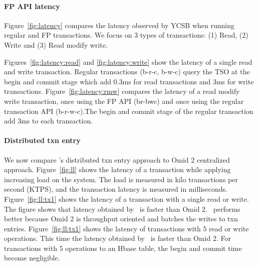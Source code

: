 \paragraph{FP API latency}
Figure~\ref{fig:latency} compares the latency observed by YCSB when running regular and FP transactions.
We focus on 3 types of transactions: (1) Read, (2) Write and (3) Read modify write.

Figures~\ref{fig:latency:read} and \ref{fig:latency:write} show the latency of a single read and write transaction. Regular transactions (b-r-c, b-w-c) query the TSO at the begin and commit stage which add 0.3ms for read transactions and 3ms for write transactions.
Figure~\ref{fig:latency:rmw} compares the latency of a read modify write transaction, once using the FP API (br-bwc) and once using the regular transaction API (b-r-w-c).The begin and commit stage of the regular transaction add 3ms to each transaction.

\paragraph{Distributed txn entry}
We now compare \sys's distributed txn entry approach to Omid 2 centralized approach. Figure~\ref{fig:ll} shows the latency of a transaction while applying increasing load on the system. The load is measured in kilo transactions per second (KTPS), and the transaction latency is measured in milliseconds. Figure~\ref{fig:ll:tx1} shows the latency of a transaction with a single read or write. The figure shows that latency obtained by \sys\ is  faster than Omid 2. \sys\ performs better because Omid 2 is throughput oriented and batches the writes to txn entries.
Figure~\ref{fig:ll:tx1} shows the latency of transactions with 5 read or write operations. This time the latency obtained by \sys\ is  faster than Omid 2. For transactions with 5 operations to an Hbase table, the begin and commit time become negligible.






